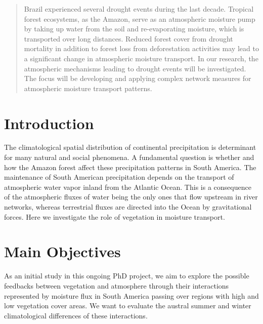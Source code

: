 \documentclass[a0, portrait]{a0poster}
\begin{document}
\begin{multicols}{2} 

\color{Blue} 

\begin{abstract}

  \vspace{1cm}
  
  \noindent Brazil experienced several drought events during the last
  decade. Tropical forest ecosystems, as the Amazon, serve as an atmospheric
  moisture pump by taking up water from the soil and re-evaporating moisture,
  which is transported over long distances.  Reduced forest cover from drought
  mortality in addition to forest loss from deforestation activities may lead to a
  significant change in atmospheric moisture transport. In our research, the
  atmospheric mechanisms leading to drought events will be investigated.  The
  focus will be developing and applying complex network measures for atmospheric
  moisture transport patterns.

\end{abstract}

\color{Black} 

\section*{\centering Introduction}

The climatological spatial distribution of continental precipitation is
determinant for many natural and social phenomena. A fundamental question is
whether and how the Amazon forest affect these precipitation patterns in South
America. The maintenance of South American precipitation depends on the
transport of atmospheric water vapor inland from the Atlantic Ocean. This is a
consequence of the atmospheric fluxes of water being the only ones that flow
upstream in river networks, whereas terrestrial fluxes are directed into the
Ocean by gravitational forces. Here we investigate the role of vegetation in
moisture transport.

\section*{\centering Main Objectives}

As an initial study in this ongoing PhD project, we aim to explore the possible
feedbacks between vegetation and atmosphere through their interactions
represented by moisture flux in South America passing over regions with high and
low vegetation cover areas. We want to evaluate the austral summer and winter
climatological differences of these interactions.


\end{multicols}
\end{document}
